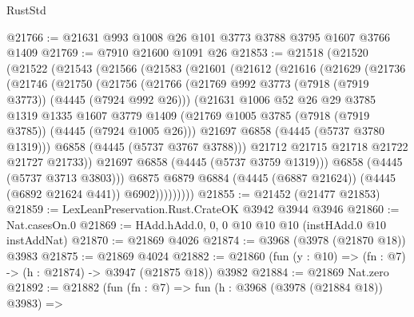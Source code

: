 \begin{lexlean}{RustStd}
\begin{coremodule}
@21766 := @21631 @993 @1008 @26 @101 @3773 @3788 @3795 @1607 @3766 @1409
@21769 := @7910 @21600 @1091 @26
@21853 := @21518
    (@21520
      (@21522
        (@21543
          (@21566
            (@21583
              (@21601
                (@21612
                  (@21616
                    (@21629
                      (@21736
                        (@21746
                          (@21750
                            (@21756
                              (@21766
                                (@21769 @992 @3773 (@7918 (@7919 @3773)) (@4445 (@7924 @992 @26)))
                                (@21631
                                  @1006
                                  @52
                                  @26
                                  @29
                                  @3785
                                  @1319
                                  @1335
                                  @1607
                                  @3779
                                  @1409
                                  (@21769
                                    @1005
                                    @3785
                                    (@7918 (@7919 @3785))
                                    (@4445 (@7924 @1005 @26)))
                                  @21697
                                  @6858
                                  (@4445 (@5737 @3780 @1319)))
                                @6858
                                (@4445 (@5737 @3767 @3788)))
                              @21712
                              @21715
                              @21718
                              @21722
                              @21727
                              @21733))
                          @21697
                          @6858
                          (@4445 (@5737 @3759 @1319)))
                        @6858
                        (@4445 (@5737 @3713 @3803)))
                      @6875
                      @6879
                      @6884
                      (@4445 (@6887 @21624))
                      (@4445 (@6892 @21624 @441))
                      @6902)))))))))
@21855 := @21452 (@21477 @21853)
@21859 := LexLeanPreservation.Rust.CrateOK @3942 @3944 @3946
@21860 := Nat.casesOn.{0}
@21869 := HAdd.hAdd.{0, 0, 0} @10 @10 @10 (instHAdd.{0} @10 instAddNat)
@21870 := @21869 @4026
@21874 := @3968 (@3978 (@21870 @18)) @3983
@21875 := @21869 @4024
@21882 := @21860 (fun (y : @10) => (fn : @7) -> (h : @21874) -> @3947 (@21875 @18)) @3982
@21884 := @21869 Nat.zero
@21892 := @21882
    (fun (fn : @7) =>
    fun (h : @3968 (@3978 (@21884 @18)) @3983) =>

\end{coremodule}
\end{lexlean}
